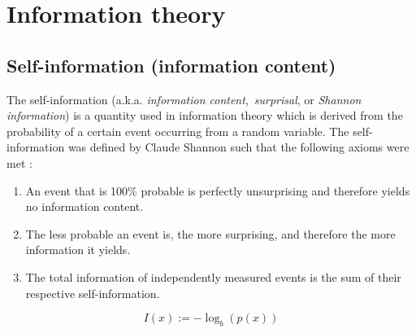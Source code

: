 \newpage\section{Information theory}\label{sec:information_theory}

\subsection{Self-information (information content)}

The self-information (a.k.a. \textit{information content},~\textit{surprisal},
or \textit{Shannon information}) is a quantity used in information theory which
is derived from the probability of a certain event occurring from a random
variable. The self-information was defined by Claude Shannon such that
the following axioms were met \cite{ElementaryInformationTheory1979}:

\begin{enumerate}
    \item An event that is 100\% probable is perfectly unsurprising and
    therefore yields no information content.
    \item The less probable an event is, the more surprising, and therefore the
    more information it yields.
    \item The total information of independently measured events is the
    sum of their respective self-information.
\end{enumerate}

\begin{equation}
    I(x):=-\log_b(p(x))
\end{equation}





